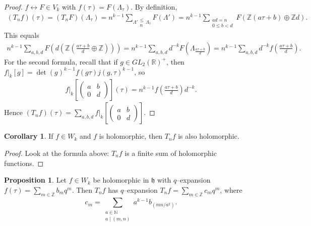 \documentclass{article}
\theoremstyle{definition}
\newtheorem{cor}[theorem]{Corollary}
\newtheorem{prop}[theorem]{Proposition}
\begin{document}
\begin{proof}
    $f \leftrightarrow F \in V_k$ with $f(\tau) = F(\Lambda_\tau)$. By definition, 
    \begin{align*}
        (T_n f)(\tau) = (T_n F)(\Lambda_\tau) = n^{k-1} \sum_{\Lambda' \substack{\le \\ n}\Lambda_{\tau}}^{} F(\Lambda') = n^{k-1} \sum_{\substack{ad=n \\ 0\le b<d}} F(\mathbb{Z}(a \tau + b)\oplus \mathbb{Z} d).
    \end{align*}
    This equals 
    \begin{align*}
        n^{k-1}\sum_{a,b,d}^{} F(d (\mathbb{Z}(\frac{a \tau + b}{d} \oplus \mathbb{Z}))) = n^{k-1}\sum_{a,b,d}^{} d^{-k}F(\Lambda_{\frac{a \tau + b}{d}}) = n^{k-1} \sum_{a,b,d}^{} d^{-k}f(\frac{a \tau +b}{d}).
    \end{align*}
    For the second formula, recall that if $g \in GL_2(\mathbb{R})^+$, then $f|_k[g] = \det(g)^{k-1}f(g \tau)j(g,\tau)^{k-1}$, so
    \begin{align*}
        f|_k\left[\begin{pmatrix} a&b\\0&d \end{pmatrix}\right](\tau) = n^{k-1} f\left(\frac{a \tau + b}{d}\right)d^{-k}.
    \end{align*}
    Hence $(T_n f)(\tau) = \sum_{a,b,d}^{} f|_k \left[\begin{pmatrix} a & b \\ 0 &d \end{pmatrix}\right]$.
\end{proof}
\begin{cor}
    If $f \in W_k$ and $f$ is holomorphic, then $T_n f$ is also holomorphic.
\end{cor}
\begin{proof}
    Look at the formula above: $T_n f$ is a finite sum of holomorphic functions.
\end{proof}
\begin{prop}
    Let $f \in W_k$ be holomorphic in $\mathfrak{h}$ with $q$--expansion $f(\tau) = \sum_{m \in \mathbb{Z}}^{} b_m q^m$. Then $T_n f$ has $q$--expansion $T_n f = \sum_{m \in \mathbb{Z}}^{} c_m q^m$, where $$c_m = \sum_{\substack{a \in \mathbb{N} \\ a \mid (m,n)}}^{} a^{k-1}b_{(mn/a^2)}.$$
\end{prop}
\end{document}

